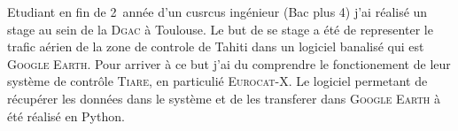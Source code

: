 Etudiant en fin de 2\ieme\ année d'un cusrcus ingénieur (Bac plus 4) j'ai réalisé un stage au sein de la \textsc{Dgac} à Toulouse. Le but de se stage a été de representer le trafic aérien de la zone de controle de Tahiti dans un logiciel banalisé qui est \textsc{Google Earth}. Pour arriver à ce but j'ai du comprendre le fonctionement de leur système de contrôle \textsc{Tiare}, en particulié \textsc{Eurocat-X}. Le logiciel permetant de récupérer les données dans le système et de les transferer dans \textsc{Google Earth} à été réalisé en Python.
